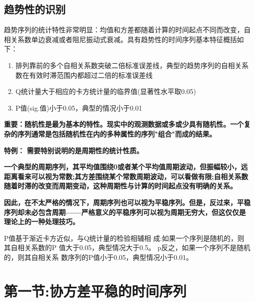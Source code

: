 \subsection{趋势性的识别}
趋势序列的统计特性非常明显：均值和方差都随着计算的时间起点不同而改变，自相关系数单边衰减或者阻尼振动式衰减。具有趋势性的时间序列基本特征概括如下：
\begin{enumerate}
    \item 排列靠前的多个自相关系数突破二倍标准误差线，典型的趋势序列的自相关系数在有效时滞范围内都超过二倍的标准误差线
    \item Q统计量大于相应的卡方统计量的临界值(显著性水平取0.05)
    \item P值(sig.值)小于0.05，典型的情况小于0.01
\end{enumerate}



\textbf{重要：随机性是最为基本的特性。现实中的观测数据或多或少具有随机性。一个复杂的序列通常是包括随机性在内的多种属性的序列"组合"而成的结果。}

\textbf{特例：}
\textbf{需要特别说明的是周期性的统计性质。}

\textbf{一个典型的周期序列，其平均值围绕0或者某个平均值周期波动，但振幅较小，远距离看来可以视为常数;其方差围绕某个常数周期波动，可以看做有限;自相关系数随着时滞的改变而周期变动，这种周期性与计算的时间起点没有明确的关系。}

\textbf{因此，在不太严格的情况下，周期序列也可以视为平稳序列。但是，反过来，平稳序列却未必包含周期——严格意义的平稳序列可以视为周期无穷大，但这仅仅是理论上的一种处理技巧。}




P值基于渐近卡方近似，与Q统计量的检验相辅相 成:如果一个序列是随机的，则其自相关系数的P 值大于0.05，典型情况大于0.5。
p反之，如果一个序列不是随机的，则其自相关系 数序列的P值小于0.05，典型情况小于0.01。


\section{第一节:协方差平稳的时间序列}

